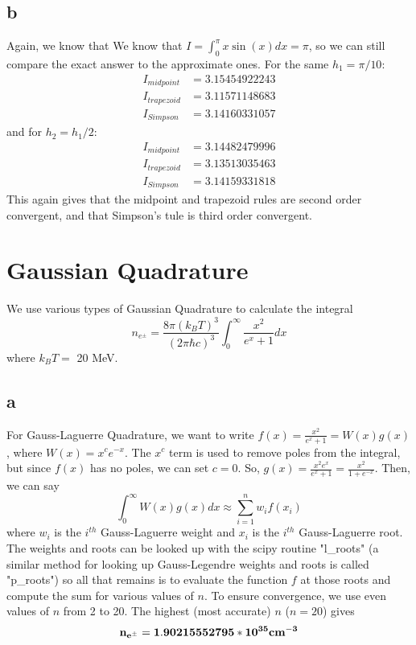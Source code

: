 \documentclass[11pt,letterpaper]{article}
\begin{document}
\subsection*{b}
Again, we know that We know that $I = \int_{0}^{\pi} x\sin(x) dx = \pi$, so 
we can still compare the exact answer to the approximate ones. For the same $h_1 = \pi /10$:
\begin{align*}
I_{midpoint} &= 3.15454922243 \\
I_{trapezoid} &= 3.11571148683 \\
I_{Simpson} &= 3.14160331057
\end{align*}
and for $h_2 = h_1 / 2$:
\begin{align*}
I_{midpoint} &= 3.14482479996\\
I_{trapezoid} &= 3.13513035463\\
I_{Simpson} &= 3.14159331818
\end{align*}
This again gives that the midpoint and trapezoid rules are second order 
convergent, and that Simpson's tule is third order convergent.


\section{Gaussian Quadrature}
We use various types of Gaussian Quadrature to calculate the integral 
$$ n_{e^{\pm}} = \frac{8\pi(k_B T)^3}{(2\pi\hbar c)^3}\int_{0}^{\infty} \frac{x^2}{e^x + 1} dx$$ where $k_B T =$ 20 MeV.

\subsection*{a}
For Gauss-Laguerre Quadrature, we want to write $f(x) = \frac{x^2}{e^x + 1} = W(x)g(x)$, where $W(x) = x^c e^{-x}$. The $x^c$ term is used to remove poles from 
the integral, but since $f(x)$ has no poles, we can set $c = 0$. So, 
$g(x) = \frac{x^2 e^x}{e^x + 1} = \frac{x^2}{1 + e^{-x}}$. Then, we can say 
$$ \int_{0}^{\infty} W(x)g(x) dx \approx \sum\limits_{i=1}^{n} w_i f(x_i)$$ 
where $w_i$ is the $i^{th}$ Gauss-Laguerre weight and $x_i$ is the $i^{th}$ 
Gauss-Laguerre root. The weights and roots can be looked up with the scipy
routine "l\_roots" (a similar method for looking up Gauss-Legendre weights 
and roots is called "p\_roots") so all that remains is to evaluate the function $f$ at those roots and compute the sum for various values of $n$. 
To ensure convergence, we use even values of $n$ from 2 to 20. The highest (most accurate) $n$ ($n = 20$) gives 
$$ {\bf n_{e^{\pm}} = 1.90215552795*10^{35} cm^{-3} }$$
\end{document}
